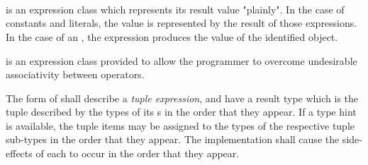 
\begin{grammar}
 \\
	 \\
	 \\
	 \\
	 \\
	 \\

 \\
	 \\
	\terminal{(}  \terminal{)} \\
	\terminal{(}  \terminal{)} \\

 \\
	 \terminal{,}  \optional{\terminal{,}} \\
	 \terminal{,}  \\
\end{grammar}

\specsubsubitem
{} is an expression class which represents its
result value "plainly". In the case of constants and literals, the value is
represented by the result of those expressions. In the case of an
, the expression produces the value of the identified
object.

\specsubsubitem
{} is an expression class provided to allow the
programmer to overcome undesirable associativity between operators.

\specsubsubitem
The  form of  shall
describe a \textit{tuple expression}, and have a result type which is the tuple
described by the types of its s in the order that they
appear. If a type hint is available, the tuple items may be assigned to the
types of the respective tuple sub-types in the order that they appear. The
implementation shall cause the side-effects of each  to
occur in the order that they appear.


\begin{grammar}
 \\
	 \terminal{(}  \terminal{)} \\
	 \terminal{(}   \terminal{)} \\
	 \terminal{(}  \terminal{,}  \terminal{)} \\
	 \terminal{(}  \terminal{)} \\
\end{grammar}

